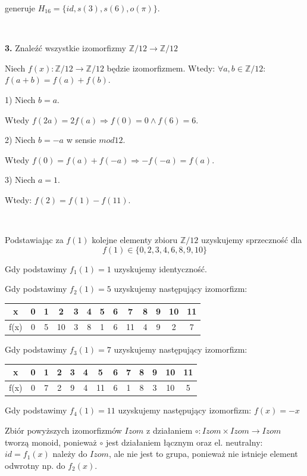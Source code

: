 \documentclass{article}
\begin{document}
generuje $H_{16}=\{id,s(3),s(6),o(\pi)\}$.

\ 
\begin{center}
 \Large \textbf{3.} Znaleźć wszystkie izomorfizmy $\mathds{Z}/12 \rightarrow \mathds{Z}/12$
  
\end{center}

Niech $f(x): \mathds{Z}/12 \rightarrow \mathds{Z}/12$ będzie izomorfizmem. Wtedy: $\forall a,b\in \mathds{Z}/12$: $f(a+b)=f(a)+f(b)$.

1) Niech $b=a$.

Wtedy $f(2a)=2f(a)\Rightarrow f(0)=0\wedge f(6)=6$.

2) Niech $b=-a$ w sensie $mod12$.

Wtedy $f(0)=f(a)+f(-a)\Rightarrow -f(-a)=f(a)$.

3) Niech $a=1$. 

Wtedy: $f(2)=f(1)-f(11)$.

\ 

Podstawiając za $f(1)$ kolejne elementy zbioru $\mathds{Z}/12$ uzyskujemy sprzeczność dla $$f(1)\in \{0,2,3,4,6,8,9,10\}$$ 

Gdy podstawimy $f_1(1)=1$ uzyskujemy identyczność.

Gdy podstawimy $f_2(1)=5$ uzyskujemy następujący izomorfizm:
\begin{center}
\begin{tabular}{c|c c c c c c c c c c c c}
x & 0 & 1 & 2 & 3 & 4 & 5 & 6 & 7 & 8 & 9 & 10 & 11 \\\hline
f(x) & 0 & 5 & 10 & 3 & 8 & 1 & 6 & 11 & 4 & 9 & 2 & 7 \\
\end{tabular}
\end{center}

Gdy podstawimy $f_3(1)=7$ uzyskujemy następujący izomorfizm:
\begin{center}
\begin{tabular}{c|c c c c c c c c c c c c}
x & 0 & 1 & 2 & 3 & 4 & 5 & 6 & 7 & 8 & 9 & 10 & 11 \\\hline
f(x) & 0 & 7 & 2 & 9 & 4 & 11 & 6 & 1 & 8 & 3 & 10 & 5 \\
\end{tabular}
\end{center}

Gdy podstawimy $f_4(1)=11$ uzyskujemy następujący izomorfizm: 
$f(x) = -x$

Zbiór powyższych izomorfizmów $Izom$ z działaniem $\circ:Izom\times Izom\rightarrow Izom$ tworzą monoid, ponieważ $\circ$ jest działaniem łącznym oraz el. neutralny: $id=f_1(x)$ należy do $Izom$, ale nie jest to grupa, ponieważ nie istnieje element odwrotny np. do $f_2(x)$.
\end{document}
